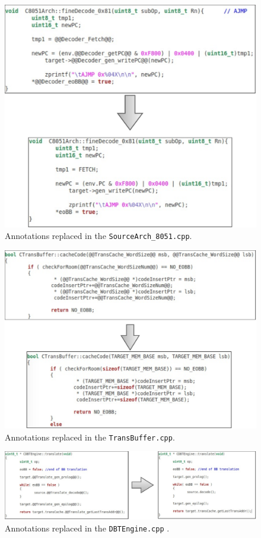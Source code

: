 \documentclass[12pt]{article}
\begin{document}
{\begin{figure}[H]
\centerline{
\includegraphics[scale=0.4]{images/annotation_test1}
}
\caption{Annotations replaced in the \texttt{SourceArch\_8051.cpp}.}
\label{fig:annotation_test1}
\end{figure}

\begin{figure}[H]
\centerline{
\includegraphics[scale=0.5]{images/annotation_test2}
}
\caption{Annotations replaced in the \texttt{TransBuffer.cpp}.}
\label{fig:annotation_test2}
\end{figure}

\begin{figure}[H]
\centerline{
\includegraphics[scale=0.5]{images/annotation_test3}
}
\caption{Annotations replaced in the \texttt{DBTEngine.cpp} .}
\label{fig:annotation_test3}
\end{figure}

}
\end{document}
